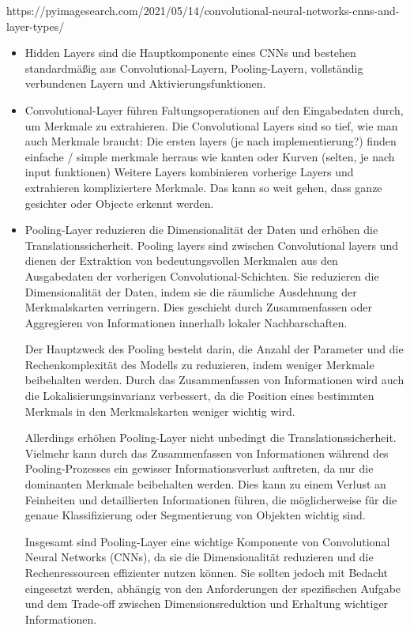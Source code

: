 https://pyimagesearch.com/2021/05/14/convolutional-neural-networks-cnns-and-layer-types/


\begin{itemize}
  \item Hidden Layers sind die Hauptkomponente eines CNNs und bestehen standardmäßig aus Convolutional-Layern, Pooling-Layern, vollständig verbundenen Layern und Aktivierungsfunktionen.
  \item Convolutional-Layer führen Faltungsoperationen auf den Eingabedaten durch, um Merkmale zu extrahieren.
  \subitem Die Convolutional Layers sind so tief, wie man auch Merkmale braucht: Die ersten layers (je nach implementierung?) finden einfache / simple merkmale herraus wie kanten oder Kurven (selten, je nach input funktionen)
  \subitem Weitere Layers kombinieren vorherige Layers und extrahieren kompliziertere Merkmale.
  \subitem Das kann so weit gehen, dass ganze gesichter oder Objecte erkennt werden. 
  \item Pooling-Layer reduzieren die Dimensionalität der Daten und erhöhen die Translationssicherheit.
  \subitem Pooling layers sind zwischen Convolutional layers und dienen der Extraktion von bedeutungsvollen Merkmalen aus den Ausgabedaten der vorherigen Convolutional-Schichten. Sie reduzieren die Dimensionalität der Daten, indem sie die räumliche Ausdehnung der Merkmalskarten verringern. Dies geschieht durch Zusammenfassen oder Aggregieren von Informationen innerhalb lokaler Nachbarschaften.

Der Hauptzweck des Pooling besteht darin, die Anzahl der Parameter und die Rechenkomplexität des Modells zu reduzieren, indem weniger Merkmale beibehalten werden. Durch das Zusammenfassen von Informationen wird auch die Lokalisierungsinvarianz verbessert, da die Position eines bestimmten Merkmals in den Merkmalskarten weniger wichtig wird.

Allerdings erhöhen Pooling-Layer nicht unbedingt die Translationssicherheit. Vielmehr kann durch das Zusammenfassen von Informationen während des Pooling-Prozesses ein gewisser Informationsverlust auftreten, da nur die dominanten Merkmale beibehalten werden. Dies kann zu einem Verlust an Feinheiten und detaillierten Informationen führen, die möglicherweise für die genaue Klassifizierung oder Segmentierung von Objekten wichtig sind.

Insgesamt sind Pooling-Layer eine wichtige Komponente von Convolutional Neural Networks (CNNs), da sie die Dimensionalität reduzieren und die Rechenressourcen effizienter nutzen können. Sie sollten jedoch mit Bedacht eingesetzt werden, abhängig von den Anforderungen der spezifischen Aufgabe und dem Trade-off zwischen Dimensionsreduktion und Erhaltung wichtiger Informationen.


\end{itemize}

